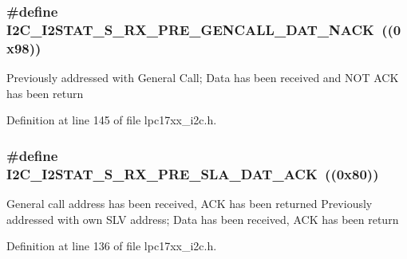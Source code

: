 \subsubsection[{\texorpdfstring{I2\+C\+\_\+\+I2\+S\+T\+A\+T\+\_\+\+S\+\_\+\+R\+X\+\_\+\+P\+R\+E\+\_\+\+G\+E\+N\+C\+A\+L\+L\+\_\+\+D\+A\+T\+\_\+\+N\+A\+CK}{I2C_I2STAT_S_RX_PRE_GENCALL_DAT_NACK}}]{\setlength{\rightskip}{0pt plus 5cm}\#define I2\+C\+\_\+\+I2\+S\+T\+A\+T\+\_\+\+S\+\_\+\+R\+X\+\_\+\+P\+R\+E\+\_\+\+G\+E\+N\+C\+A\+L\+L\+\_\+\+D\+A\+T\+\_\+\+N\+A\+CK~((0x98))}\hypertarget{group___i2_c___private___macros_ga20c65f8a82c18211127e5c335026bd76}{}\label{group___i2_c___private___macros_ga20c65f8a82c18211127e5c335026bd76}
Previously addressed with General Call; Data has been received and N\+OT A\+CK has been return 

Definition at line 145 of file lpc17xx\+\_\+i2c.\+h.

\subsubsection[{\texorpdfstring{I2\+C\+\_\+\+I2\+S\+T\+A\+T\+\_\+\+S\+\_\+\+R\+X\+\_\+\+P\+R\+E\+\_\+\+S\+L\+A\+\_\+\+D\+A\+T\+\_\+\+A\+CK}{I2C_I2STAT_S_RX_PRE_SLA_DAT_ACK}}]{\setlength{\rightskip}{0pt plus 5cm}\#define I2\+C\+\_\+\+I2\+S\+T\+A\+T\+\_\+\+S\+\_\+\+R\+X\+\_\+\+P\+R\+E\+\_\+\+S\+L\+A\+\_\+\+D\+A\+T\+\_\+\+A\+CK~((0x80))}\hypertarget{group___i2_c___private___macros_ga4342227592c3e2e345517bd3e6cd8089}{}\label{group___i2_c___private___macros_ga4342227592c3e2e345517bd3e6cd8089}
General call address has been received, A\+CK has been returned Previously addressed with own S\+LV address; Data has been received, A\+CK has been return 

Definition at line 136 of file lpc17xx\+\_\+i2c.\+h.

